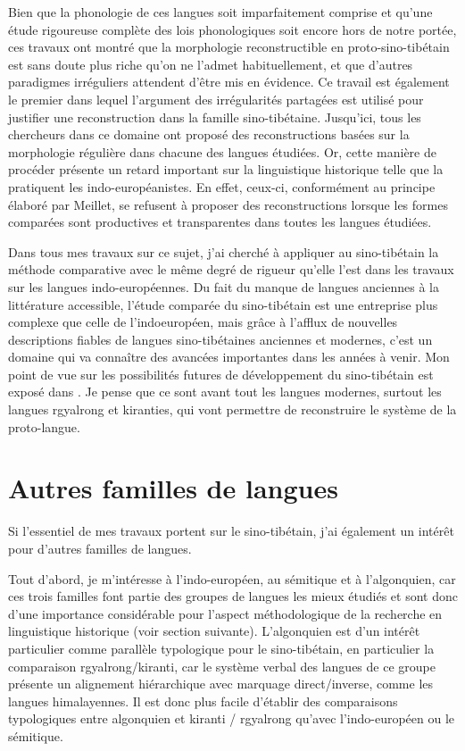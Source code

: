 \documentclass[oldfontcommands,oneside,a4paper,11pt]{memoir}
\begin{document}
Bien que la phonologie de ces langues soit imparfaitement comprise et qu’une étude rigoureuse complète des lois phonologiques soit encore hors de notre portée, ces travaux ont montré que la morphologie reconstructible en proto-sino-tibétain est sans doute plus riche qu’on ne l’admet habituellement, et que d’autres paradigmes irréguliers attendent d’être mis en évidence. Ce travail est également le premier dans lequel l’argument des irrégularités partagées est utilisé pour justifier une reconstruction dans la famille sino-tibétaine. Jusqu’ici, tous les chercheurs dans ce domaine ont proposé des reconstructions basées sur la morphologie régulière dans chacune des langues étudiées. Or, cette manière de procéder présente un retard important sur la linguistique historique telle que la pratiquent les indo-européanistes. En effet, ceux-ci, conformément au principe élaboré par Meillet, se refusent à proposer des reconstructions lorsque les formes comparées sont productives et transparentes dans toutes les langues étudiées. 


	Dans tous mes travaux sur ce sujet, j’ai cherché à appliquer au sino-tibétain la méthode comparative avec le même degré de rigueur qu’elle l’est dans les travaux sur les langues indo-européennes. Du fait du manque de langues anciennes à la littérature accessible, l’étude comparée du sino-tibétain est une entreprise plus complexe que celle de l’indoeuropéen, mais grâce à l’afflux de nouvelles descriptions fiables de langues sino-tibétaines anciennes et modernes, c’est un domaine qui va connaître des avancées importantes dans les années à venir. Mon point de vue sur les possibilités futures de développement du sino-tibétain est exposé dans \citet{jacques2012genetic}. Je pense que ce sont avant tout les langues modernes, surtout les langues rgyalrong et kiranties, qui vont permettre de reconstruire le système de la proto-langue. 
	
\chapter{Autres familles de langues}
Si l'essentiel de mes travaux portent sur le sino-tibétain, j'ai également un intérêt pour d'autres familles de langues. 

Tout d'abord, je m'intéresse à l'indo-européen, au sémitique et à l'algonquien, car ces trois familles font partie des groupes de langues les mieux étudiés et sont donc d'une importance considérable pour l'aspect méthodologique de la recherche en linguistique historique (voir section suivante). L'algonquien est d'un intérêt particulier comme parallèle typologique pour le sino-tibétain, en particulier la comparaison rgyalrong/kiranti, car le système verbal des langues de ce groupe présente un alignement hiérarchique avec marquage direct/inverse, comme les langues himalayennes. Il est donc plus facile d'établir des comparaisons typologiques entre algonquien et kiranti / rgyalrong qu'avec l'indo-européen ou le sémitique. 
\end{document}
